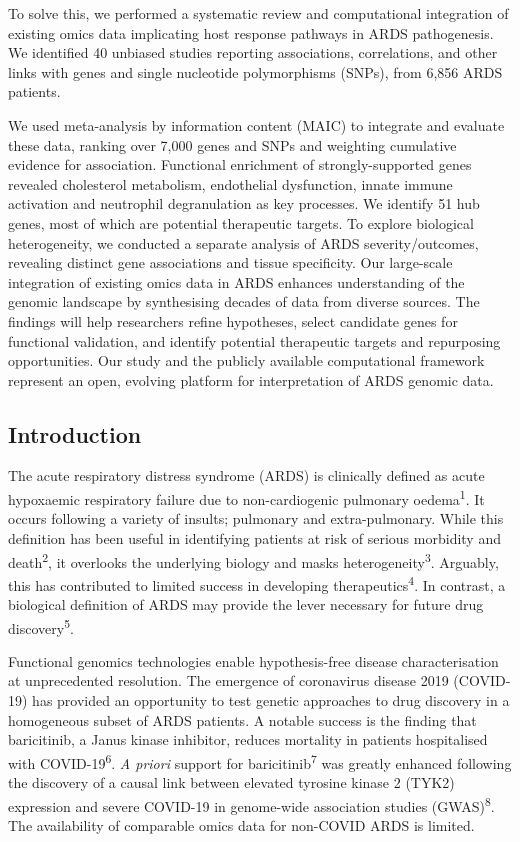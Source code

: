 \documentclass[
  11,
  a4paper,
]{article}
\begin{document}
To solve this, we performed a systematic review and computational
integration of existing omics data implicating host response pathways in
ARDS pathogenesis. We identified 40 unbiased studies reporting
associations, correlations, and other links with genes and single
nucleotide polymorphisms (SNPs), from 6,856 ARDS patients.

We used meta-analysis by information content (MAIC) to integrate and
evaluate these data, ranking over 7,000 genes and SNPs and weighting
cumulative evidence for association. Functional enrichment of
strongly-supported genes revealed cholesterol metabolism, endothelial
dysfunction, innate immune activation and neutrophil degranulation as
key processes. We identify 51 hub genes, most of which are potential
therapeutic targets. To explore biological heterogeneity, we conducted a
separate analysis of ARDS severity/outcomes, revealing distinct gene
associations and tissue specificity. Our large-scale integration of
existing omics data in ARDS enhances understanding of the genomic
landscape by synthesising decades of data from diverse sources. The
findings will help researchers refine hypotheses, select candidate genes
for functional validation, and identify potential therapeutic targets
and repurposing opportunities. Our study and the publicly available
computational framework represent an open, evolving platform for
interpretation of ARDS genomic data.

\newpage

\subsection{Introduction}\label{introduction}

The acute respiratory distress syndrome (ARDS) is clinically defined as
acute hypoxaemic respiratory failure due to non-cardiogenic pulmonary
oedema\textsuperscript{1}. It occurs following a variety of insults;
pulmonary and extra-pulmonary. While this definition has been useful in
identifying patients at risk of serious morbidity and
death\textsuperscript{2}, it overlooks the underlying biology and masks
heterogeneity\textsuperscript{3}. Arguably, this has contributed to
limited success in developing therapeutics\textsuperscript{4}. In
contrast, a biological definition of ARDS may provide the lever
necessary for future drug discovery\textsuperscript{5}.

Functional genomics technologies enable hypothesis-free disease
characterisation at unprecedented resolution. The emergence of
coronavirus disease 2019 (COVID-19) has provided an opportunity to test
genetic approaches to drug discovery in a homogeneous subset of ARDS
patients. A notable success is the finding that baricitinib, a Janus
kinase inhibitor, reduces mortality in patients hospitalised with
COVID-19\textsuperscript{6}. \emph{A priori} support for
baricitinib\textsuperscript{7} was greatly enhanced following the
discovery of a causal link between elevated tyrosine kinase 2 (TYK2)
expression and severe COVID-19 in genome-wide association studies
(GWAS)\textsuperscript{8}. The availability of comparable omics data for
non-COVID ARDS is limited.
\end{document}
